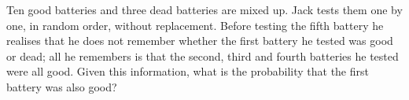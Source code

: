 Ten good batteries and three dead batteries are mixed up. Jack tests them one by one, in random order, without replacement. Before testing the fifth battery he realises that he does not remember whether the first battery he tested was good or dead; all he remembers is that the second, third and fourth batteries he tested were all good. Given this information, what is the probability that the first battery was also good?
